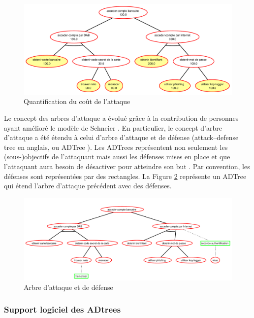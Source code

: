         \begin{figure}[h]
	        \centering
	        \includegraphics[width=1\textwidth]{figure/quantification.pdf}
	        \caption{Quantification du coût de l'attaque}
	        \label{fig:arbre_exemple_2}
        \end{figure}

		Le concept des arbres d'attaque a évolué grâce à la contribution de personnes ayant amélioré le modèle de Schneier \cite{ADTreeKordy}. En particulier, le concept d'arbre d'attaque a été étendu à celui d’arbre d’attaque et de défense (\og attack–defense tree \fg{} en anglais, ou \og ADTree \fg{}). Les ADTrees représentent non seulement les (sous-)objectifs de l'attaquant mais aussi les défenses mises en place et que l'attaquant aura besoin de désactiver pour atteindre son but \cite{ADTreeOxford}. Par convention, les défenses sont représentées par des rectangles. La Figure \ref{fig:arbre_exemple_3} représente un ADTree qui étend l'arbre d'attaque précédent avec des défenses.
        \begin{figure}[h]
	        \centering
	        \includegraphics[width=1\textwidth]{figure/exemple2_rapport.pdf}
	        \caption{Arbre d'attaque et de défense}
	        \label{fig:arbre_exemple_3}
        \end{figure}



        \subsubsection{Support logiciel des ADtrees}

